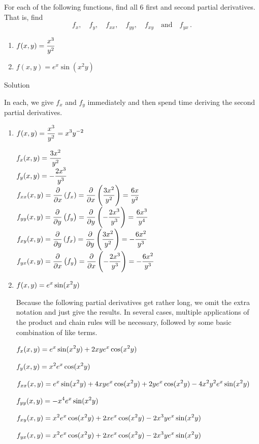 \begin{example}\label{ex_partial6}
For each of the following functions, find all 6 first and second partial derivatives. That is, find 
$$f_x,\quad f_y,\quad f_{xx},\quad f_{yy},\quad f_{xy}\quad \text{and}\quad f_{yx}\,.$$
\begin{multicols}{2}
\begin{enumerate}
	\item	$\displaystyle f(x,y) = \frac{x^3}{y^2}$
	\item	$f(x,y)=e^{x}\sin(x^2y)$
\end{enumerate}
\end{multicols}
Solution 

In each, we give $f_x$ and $f_y$ immediately and then spend time deriving the second partial derivatives.

\begin{enumerate}	
	\item		$\displaystyle f(x,y) = \frac{x^3}{y^2} = x^3y^{-2}$
\begin{multicols}{2}
	$\displaystyle f_x(x,y) = \frac{3x^2}{y^2}$\\
	$\displaystyle f_y(x,y) = -\frac{2x^3}{y^3}$\\
	$\displaystyle f_{xx}(x,y) = \frac{\partial}{\partial x}\left(f_x\right) = \frac{\partial}{\partial x}\left(\frac{3x^2}{y^2}\right) = \frac{6x}{y^2}$\\		
$\displaystyle f_{yy}(x,y) = \frac{\partial}{\partial y}\left(f_y\right) = \frac{\partial}{\partial y}\left(-\frac{2x^3}{y^3}\right) = \frac{6x^3}{y^4}$\\	
$\displaystyle f_{xy}(x,y) = \frac{\partial}{\partial y}\left(f_x\right) = \frac{\partial}{\partial y}\left(\frac{3x^2}{y^2}\right) = -\frac{6x^2}{y^3}$\\
$\displaystyle f_{yx}(x,y) = \frac{\partial}{\partial x}\left(f_y\right) = \frac{\partial}{\partial x}\left(-\frac{2x^3}{y^3}\right) = 
-\frac{6x^2}{y^3}$	
\end{multicols}
\item	$\displaystyle f(x,y) = e^x\sin(x^2y)$

  Because the following partial derivatives get rather long, we omit the extra notation and just give the results. In several cases, multiple applications of the product and chain rules will be necessary, followed by some basic combination of like terms.


$\displaystyle f_x(x,y) = e^x\sin(x^2y) + 2xye^x\cos(x^2y)$
	
	$\displaystyle f_y(x,y) = x^2e^x\cos(x^2y)$
	
	$\displaystyle f_{xx}(x,y) = e^x\sin(x^2y)+4xye^x\cos(x^2y)+2ye^x\cos(x^2y)-4x^2y^2e^x\sin(x^2y)$ 
	
	
		$\displaystyle f_{yy}(x,y) =  -x^4e^x\sin(x^2y)$
		
		$\displaystyle f_{xy}(x,y) = x^2e^x\cos(x^2y)+2xe^x\cos(x^2y)-2x^3ye^x\sin(x^2y)$
		
		$\displaystyle f_{yx}(x,y) = x^2e^x\cos(x^2y)+2xe^x\cos(x^2y)-2x^3ye^x\sin(x^2y)$

\end{enumerate}
\end{example}


